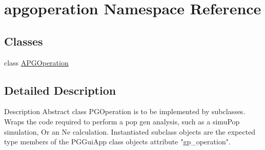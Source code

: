 \hypertarget{namespaceapgoperation}{}\section{apgoperation Namespace Reference}
\label{namespaceapgoperation}
\subsection*{Classes}
\begin{DoxyCompactItemize}
\item 
class \hyperlink{classapgoperation_1_1APGOperation}{A\+P\+G\+Operation}
\end{DoxyCompactItemize}


\subsection{Detailed Description}
\begin{DoxyVerb}Description
Abstract class PGOperation is to be implemented by subclasses.
Wraps the code required to perform a pop gen analysis, such as a simuPop simulation,
Or an Ne calculation.  Instantiated subclass objects are the expected type members 
of the PGGuiApp class objects attribute "gp_operation".\end{DoxyVerb}
 